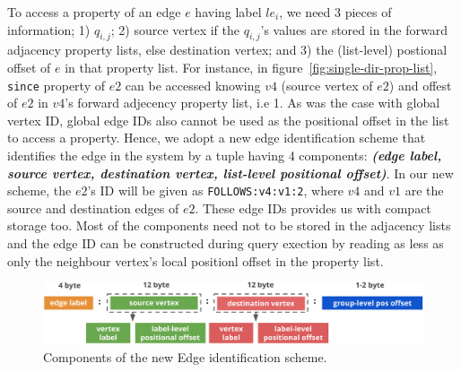 To access a property of an edge $e$ having label $le_i$, we need 3 pieces of information; 1) $q_{i,j}$; 2) source vertex if the $q_{i,j}$'s values are stored in the forward adjacency property lists, else destination vertex; and 3) the (list-level) postional offset of $e$ in that property list. For instance, in figure~\ref{fig:single-dir-prop-list}, \texttt{since} property of $e2$ can be accessed knowing $v4$ (source vertex of $e2$) and offest of $e2$ in $v4$'s forward adjecency property list, i.e 1. As was the case with global vertex ID, global edge IDs also cannot be used as the positional offset in the list to access a property. Hence, we adopt a new edge identification scheme that identifies the edge in the system by a tuple having 4 components: \textbf{\emph{(edge label, source vertex, destination vertex, list-level positional offset)}}. In our new scheme, the $e2$'s ID will be given as \texttt{FOLLOWS:v4:v1:2}, where $v4$ and $v1$ are the source and destination edges of $e2$. These edge IDs provides us with compact storage too. Most of the components need not to be stored in the adjacency lists and the edge ID can be constructed during query exection by reading as less as only the neighbour vertex's local positionl offset in the property list. 

\begin{figure}
	\vspace{-25pt}
	\hfill\includegraphics[scale=0.78]{img/edge-scheme}\hspace*{\fill}
	\captionsetup{justification=centering}
	\caption{Components of the new Edge identification scheme.}
	\label{fig:edge-scheme}
\end{figure}

